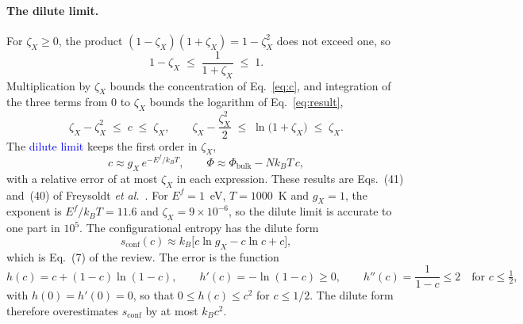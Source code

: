 \documentclass[11pt]{article}      %
\numberwithin{equation}{section}   %
\begin{document}
\paragraph{The dilute limit.}
For $\zeta_X\geq0$, the product $(1-\zeta_X)(1+\zeta_X)=1-\zeta_X^2$ does
not exceed one, so
\begin{equation*}
    1-\zeta_X\;\leq\;\frac{1}{1+\zeta_X}\;\leq\;1.
\end{equation*}
Multiplication by $\zeta_X$ bounds the concentration of Eq.~\eqref{eq:c},
and integration of the three terms from $0$ to $\zeta_X$ bounds the
logarithm of Eq.~\eqref{eq:result},
\begin{equation}
    \boxed{\zeta_X-\zeta_X^2\;\leq\;c\;\leq\;\zeta_X,
    \qquad
    \zeta_X-\frac{\zeta_X^2}{2}\;\leq\;\ln\big(1+\zeta_X\big)\;\leq\;\zeta_X.}
\end{equation}
The \textcolor{blue}{dilute limit} keeps the first order in $\zeta_X$,
\begin{equation}
    \boxed{c\approx g_X\,e^{-E^f/k_BT},
    \qquad
    \Phi\approx\Phi_{\text{bulk}}-Nk_BT\,c,}
    \label{eq:dilute}
\end{equation}
with a relative error of at most $\zeta_X$ in each expression. These
results are Eqs.~(41) and~(40) of Freysoldt \textit{et
al.}~\cite{freysoldt}. For $E^f=1$~eV, $T=1000$~K and $g_X=1$, the exponent
is $E^f/k_BT=11.6$ and $\zeta_X=9\times10^{-6}$, so the dilute limit is
accurate to one part in $10^5$. The configurational entropy has the dilute
form
\begin{equation}
    \boxed{s_{\text{conf}}(c)\approx k_B\big[c\ln g_X-c\ln c+c\big],}
    \label{eq:sconf-dilute}
\end{equation}
which is Eq.~(7) of the review. The error is the function
\begin{equation*}
    h(c)=c+(1-c)\ln(1-c),
    \qquad
    h'(c)=-\ln(1-c)\geq0,
    \qquad
    h''(c)=\frac{1}{1-c}\leq2\quad\text{for }c\leq\tfrac12,
\end{equation*}
with $h(0)=h'(0)=0$, so that $0\leq h(c)\leq c^2$ for $c\leq1/2$. The dilute
form therefore overestimates $s_{\text{conf}}$ by at most $k_Bc^2$.
\end{document}
